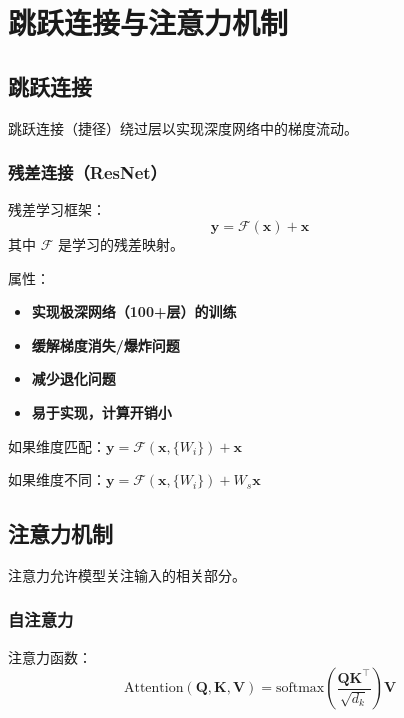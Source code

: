 %

\clearpage
\cleardoublepage

\chapter{跳跃连接与注意力机制}

\section{跳跃连接}

跳跃连接（捷径）绕过层以实现深度网络中的梯度流动。

\subsection{残差连接（ResNet）}

残差学习框架：
\begin{equation}
\mathbf{y} = \mathcal{F}(\mathbf{x}) + \mathbf{x}
\end{equation}
其中 $\mathcal{F}$ 是学习的残差映射。

属性：
\begin{itemize}
    \item \textbf{实现极深网络（100+层）的训练}
    \item \textbf{缓解梯度消失/爆炸问题}
    \item \textbf{减少退化问题}
    \item \textbf{易于实现，计算开销小}
\end{itemize}

如果维度匹配：$\mathbf{y} = \mathcal{F}(\mathbf{x}, \{W_i\}) + \mathbf{x}$

如果维度不同：$\mathbf{y} = \mathcal{F}(\mathbf{x}, \{W_i\}) + W_s\mathbf{x}$

\section{注意力机制}

注意力允许模型关注输入的相关部分。

\subsection{自注意力}

注意力函数：
\begin{equation}
\text{Attention}(\mathbf{Q}, \mathbf{K}, \mathbf{V}) = \text{softmax}\left(\frac{\mathbf{Q}\mathbf{K}^\top}{\sqrt{d_k}}\right)\mathbf{V}
\end{equation}

